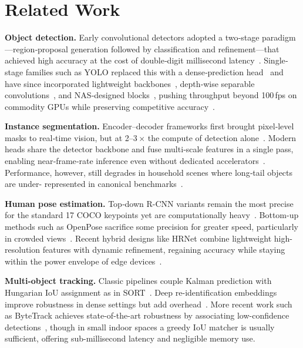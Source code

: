 
\section{Related Work}

\textbf{Object detection.} Early convolutional detectors adopted
a two‐stage paradigm---region‐proposal generation followed by
classification and refinement---that achieved high accuracy at the
cost of double‐digit millisecond latency~\cite{girshick2014rcnn,girshick2015fastrcnn}.
Single‐stage families such as YOLO replaced this with a dense‐prediction
head~\cite{redmon2017yolo9000} and have since incorporated lightweight
backbones~\cite{sandler2018mobilenetv2}, depth‐wise separable
convolutions~\cite{chollet2017xception}, and NAS‐designed blocks~\cite{howard2019mobilenetv3},
pushing throughput beyond 100\,fps on commodity GPUs while preserving
competitive accuracy~\cite{bochkovskiy2020yolov4}.

\textbf{Instance segmentation.} Encoder–decoder frameworks first
brought pixel‐level masks to real‐time vision, but at 2--3\,$\times$
the compute of detection alone~\cite{he2017maskrcnn}.  Modern heads share
the detector backbone and fuse multi‐scale features in a single pass,
enabling near‐frame‐rate inference even without dedicated
accelerators~\cite{bolya2019yolact}.  Performance, however, still
degrades in household scenes where long‐tail objects are under-
represented in canonical benchmarks~\cite{tangaro2025homeobjects3k}.

\textbf{Human pose estimation.} Top‐down R-CNN variants remain the
most precise for the standard 17 COCO keypoints yet are
computationally heavy~\cite{he2017maskrcnn}.  Bottom-up methods such
as OpenPose sacrifice some precision for greater speed,
particularly in crowded views~\cite{cao2018openpose}.  Recent hybrid
designs like HRNet combine lightweight high-resolution features
with dynamic refinement, regaining accuracy while staying within
the power envelope of edge devices~\cite{sun2019deep}.

\textbf{Multi-object tracking.} Classic pipelines couple Kalman
prediction with Hungarian IoU assignment as in SORT~\cite{bewley2016simple}.
Deep re-identification embeddings improve robustness in dense
settings but add overhead~\cite{wojke2017simple}.  More recent work
such as ByteTrack achieves state-of-the-art robustness by associating
low-confidence detections~\cite{zhang2022bytetrack}, though in small
indoor spaces a greedy IoU matcher is usually sufficient, offering
sub-millisecond latency and negligible memory use.

